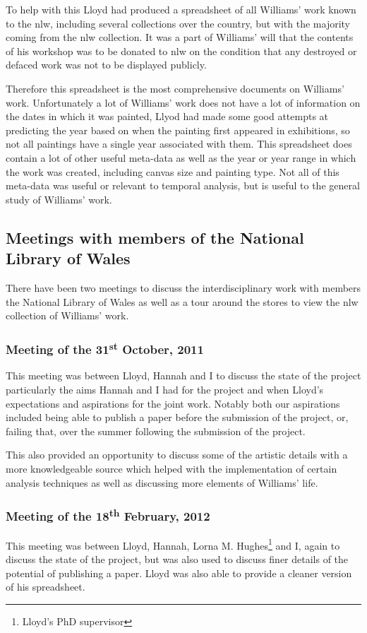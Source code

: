 To help with this Lloyd had produced a spreadsheet of all Williams' work known to the \gls{nlw}, 
including several collections over the country, but with the majority coming from the \gls{nlw}
collection. It was a part of Williams' will that the contents of his workshop was to be donated
to \gls{nlw} on the condition that any destroyed or defaced work was not to be displayed publicly.

Therefore this spreadsheet is the most comprehensive documents on Williams' work. Unfortunately a
lot of Williams' work does not have a lot of information on the dates in which it was painted, 
Llyod had made some good attempts at predicting the year based on when the painting first appeared
in exhibitions, so not all paintings have a single year associated with them. This spreadsheet 
does contain a lot of other useful meta-data as well as the year or year range in which the work 
was created, including canvas size and painting type. Not all of this meta-data was useful or 
relevant to temporal analysis, but is useful to the general study of Williams' work.

\subsection{Meetings with members of the National Library of Wales}

There have been two meetings to discuss the interdisciplinary work with members the National 
Library of Wales as well as a tour around the stores to view the \gls{nlw} collection of Williams'
work.


\subsubsection{Meeting of the 31\textsuperscript{st} October, 2011}
This meeting was between Lloyd, Hannah and I to discuss the state of the project particularly the
aims Hannah and I had for the project and when Lloyd's expectations and aspirations for the joint
work. Notably both our aspirations included being able to publish a paper before the submission of
the project, or, failing that, over the summer following the submission of the project.

This also provided an opportunity to discuss some of the artistic details with a more 
knowledgeable source which helped with the implementation of certain analysis techniques as well
as discussing more elements of Williams' life.


\subsubsection{Meeting of the 18\textsuperscript{th} February, 2012}
This meeting was between Lloyd, Hannah, Lorna M. Hughes\footnote{Lloyd's PhD supervisor} and I, again to discuss
the state of the project, but was also used to discuss finer details of the potential of 
publishing a paper. Lloyd was also able to provide a cleaner version of his spreadsheet.

